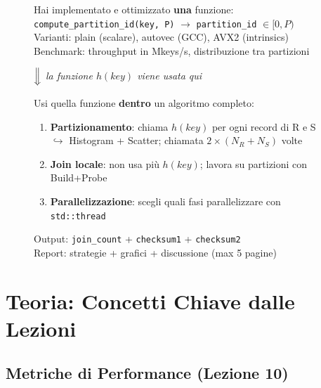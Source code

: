 \documentclass[11pt,a4paper]{article}
\begin{document}
\begin{figure}[H]
\centering
\begin{tcolorbox}[colback=white,colframe=ForestGreen,width=0.92\textwidth,arc=3pt,title=\textbf{Modulo 1}]
Hai implementato e ottimizzato \textbf{una} funzione:\\
\texttt{compute\_partition\_id(key, P)} $\to$ \texttt{partition\_id} $\in [0, P)$\\[3pt]
Varianti: plain (scalare), autovec (GCC), AVX2 (intrinsics)\\
Benchmark: throughput in Mkeys/s, distribuzione tra partizioni
\end{tcolorbox}

\smallskip
$\Big\Downarrow$ \quad \textit{la funzione $h(\mathit{key})$ viene usata qui}

\smallskip
\begin{tcolorbox}[colback=white,colframe=MidnightBlue,width=0.92\textwidth,arc=3pt,title=\textbf{Modulo 2}]
Usi quella funzione \textbf{dentro} un algoritmo completo:
\begin{enumerate}[nosep]
  \item \textbf{Partizionamento}: chiama $h(\mathit{key})$ per ogni record di R e S\\
        $\hookrightarrow$ Histogram + Scatter; chiamata $2\times(N_R+N_S)$ volte
  \item \textbf{Join locale}: non usa più $h(\mathit{key})$; lavora su partizioni con Build+Probe
  \item \textbf{Parallelizzazione}: scegli quali fasi parallelizzare con \texttt{std::thread}
\end{enumerate}
Output: \texttt{join\_count} + \texttt{checksum1} + \texttt{checksum2}\\
Report: strategie + grafici + discussione (max 5 pagine)
\end{tcolorbox}
\end{figure}


\clearpage
\section{Teoria: Concetti Chiave dalle Lezioni}

\subsection{Metriche di Performance (Lezione 10)}
\end{document}

